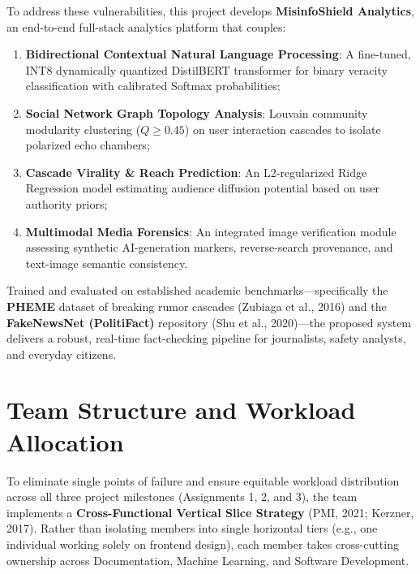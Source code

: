 \documentclass[11pt, a4paper]{article}
\begin{document}
To address these vulnerabilities, this project develops \textbf{MisinfoShield Analytics}, an end-to-end full-stack analytics platform that couples:
\begin{enumerate}
  \item \textbf{Bidirectional Contextual Natural Language Processing}: A fine-tuned, INT8 dynamically quantized DistilBERT transformer for binary veracity classification with calibrated Softmax probabilities;
  \item \textbf{Social Network Graph Topology Analysis}: Louvain community modularity clustering ($Q \ge 0.45$) on user interaction cascades to isolate polarized echo chambers;
  \item \textbf{Cascade Virality \& Reach Prediction}: An L2-regularized Ridge Regression model estimating audience diffusion potential based on user authority priors;
  \item \textbf{Multimodal Media Forensics}: An integrated image verification module assessing synthetic AI-generation markers, reverse-search provenance, and text-image semantic consistency.
\end{enumerate}

Trained and evaluated on established academic benchmarks---specifically the \textbf{PHEME} dataset of breaking rumor cascades (Zubiaga et al., 2016) and the \textbf{FakeNewsNet (PolitiFact)} repository (Shu et al., 2020)---the proposed system delivers a robust, real-time fact-checking pipeline for journalists, safety analysts, and everyday citizens.

\section{Team Structure and Workload Allocation}
\label{sec:team-structure}

To eliminate single points of failure and ensure equitable workload distribution across all three project milestones (Assignments 1, 2, and 3), the team implements a \textbf{Cross-Functional Vertical Slice Strategy} (PMI, 2021; Kerzner, 2017). Rather than isolating members into single horizontal tiers (e.g., one individual working solely on frontend design), each member takes cross-cutting ownership across Documentation, Machine Learning, and Software Development.
\end{document}
